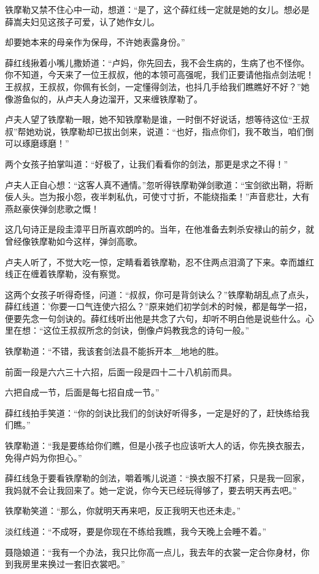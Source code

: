 \documentclass[12pt,oneside]{book}
\begin{document}
铁摩勒又禁不住心中一动，想道：``是了，这个薛红线一定就是她的女儿。想必是薛嵩夫妇见这孩子可爱，认了她作女儿。

却要她本来的母亲作为保母，不许她表露身份。''

薛红线揪着小嘴儿撒娇道：``卢妈，你先回去，我不会生病的，生病了也不怪你。你不知道，今天来了一位王叔叔，他的本领可高强呢，我们正要请他指点剑法呢！王叔叔，王叔叔，你佩有长剑，一定懂得剑法，也抖几手给我们瞧瞧好不好？''她像游鱼似的，从卢夫人身边溜开，又来缠铁摩勒了。

卢夫人望了铁摩勒一眼，她不知铁摩勒是谁，一时倒不好说话，想等待这位``王叔叔''帮她劝说，铁摩勒却已拔出剑来，说道：``也好，指点你们，我不敢当，咱们倒可以琢磨琢磨！''

两个女孩子拍掌叫道：``好极了，让我们看看你的剑法，那更是求之不得！''

卢夫人正自心想：``这客人真不通情。''忽听得铁摩勒弹剑歌道：``宝剑欲出鞘，将断佞人头。岂为报小怨，夜半刺私仇，可使寸寸折，不能绕指柔！''声音悲壮，大有燕赵豪侠弹剑悲歌之慨！

这几句诗正是段圭漳平日所喜欢朗吟的。当年，在他准备去刺杀安禄山的前夕，就曾经像铁摩勒如今这样，弹剑高歌。

卢夫人听了，不觉大吃一惊，定睛看着铁摩勒，忍不住两点泪滴了下来。幸而雄红线正在缠着铁摩勒，没有察觉。

这两个女孩子听得奇怪，问道：``叔叔，你可是背剑诀么？''铁摩勒胡乱点了点头，薛红线道：'你要一口气连使六招么？''原来她们初学剑术的时候，都是每学一招，便要先念一句剑诀的。薛红线听出他是共念了六句，却听不明白他是说些什么。心里在想：``这位王叔叔所念的剑诀，倒像卢妈教我念的诗句一般。''

铁摩勒道：``不错，我该套剑法县不能拆开本＿地地的胜。

前面一段是六六三十六招，后面一段是四十二十八机前而具。

六把自成一节，后面是每七招自成一节。''

薛红线拍手笑道：``你的剑诀比我们的剑诀好听得多，一定是好的了，赶快练给我们瞧。''

铁摩勒道：``我是要练给你们瞧，但是小孩子也应该听大人的话，你先换衣服去，免得卢妈为你担心。''

薛红线急于要看铁摩勒的剑法，嚼着嘴儿说道：``换衣服不打紧，只是我一回家，我妈就不会让我回来了。她一定说，你今天已经玩得够了，要去明天再去吧。''

铁摩勒笑道：``那么，你就明天再来吧，反正我明天也还未走。''

淡红线道：``不成呀，要是你现在不练给我瞧，我今天晚上会睡不着。''

聂隐娘道：``我有一个办法，我只比你高一点儿，我去年的衣裳一定合你身材，你到我房里来换过一套旧衣裳吧。''
\end{document}
